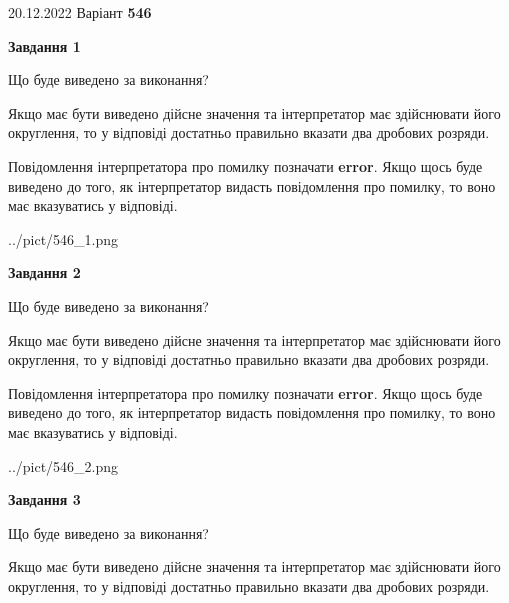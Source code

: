 \documentclass[12pt, ukrainian]{article}
\begin{document}
{20.12.2022 Варіант \No \textbf { 546 }\par}
{
\begin {Large}

{\begin {center}\textbf{Завдання 1}\end {center}}\par
Що буде виведено за виконання? \par

Якщо має бути виведено дійсне значення та інтерпретатор має здійснювати його округлення, 
то у відповіді достатньо правильно вказати два дробових розряди.

Повідомлення інтерпретатора про помилку позначати \textbf{error}.
Якщо щось буде виведено до того, як інтерпретатор видасть повідомлення про помилку, 
то воно має вказуватись у відповіді. \par

\begin{center}
	{../pict/546_1.png}
\end{center}
\newpage

{\begin {center}\textbf{Завдання 2}\end {center}}\par
Що буде виведено за виконання? \par

Якщо має бути виведено дійсне значення та інтерпретатор має здійснювати його округлення, 
то у відповіді достатньо правильно вказати два дробових розряди.

Повідомлення інтерпретатора про помилку позначати \textbf{error}.
Якщо щось буде виведено до того, як інтерпретатор видасть повідомлення про помилку, 
то воно має вказуватись у відповіді. \par

\begin{center}
	{../pict/546_2.png}
\end{center}
\newpage

{\begin {center}\textbf{Завдання 3}\end {center}}\par
Що буде виведено за виконання? \par

Якщо має бути виведено дійсне значення та інтерпретатор має здійснювати його округлення, 
то у відповіді достатньо правильно вказати два дробових розряди.


\end{Large}}
\end{document}
